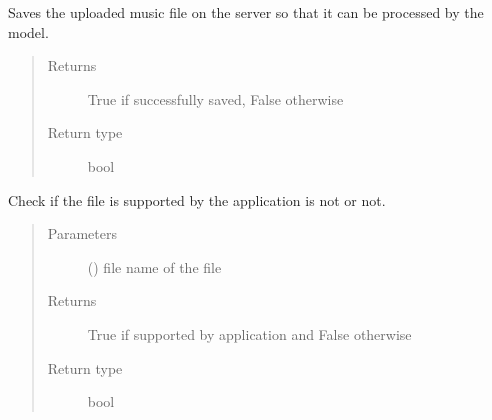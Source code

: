 \documentclass[letterpaper,10pt,english,openany,oneside]{sphinxmanual}
\begin{document}

\begin{fulllineitems}
\label{\detokenize{docs/source/application.controllers:application.controllers.file_actions.save_file}}
Saves the uploaded music file on the server so that it can be processed by the model.
\begin{quote}\begin{description}
\item[{Returns}] \leavevmode
True if successfully saved, False otherwise

\item[{Return type}] \leavevmode
bool

\end{description}\end{quote}

\end{fulllineitems}


\begin{fulllineitems}
\label{\detokenize{docs/source/application.controllers:application.controllers.file_actions.supported_file}}
Check if the file is supported by the application is not or not.
\begin{quote}\begin{description}
\item[{Parameters}] \leavevmode
{} () \textendash{} file name of the file

\item[{Returns}] \leavevmode
True if supported by application and False otherwise

\item[{Return type}] \leavevmode
bool

\end{description}\end{quote}

\end{fulllineitems}
\end{document}

